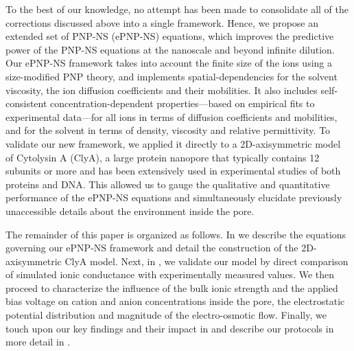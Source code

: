 \documentclass[journal=ancac3,manuscript=article,etalmode=truncate,maxauthors=0,layout=onecolumn]{achemso}
\begin{document}
To the best of our knowledge, no attempt has been made to consolidate all of the corrections discussed above
into a single framework. Hence, we propose an extended set of PNP-NS (ePNP-NS) equations, which improves the
predictive power of the PNP-NS equations at the nanoscale and beyond infinite dilution. Our ePNP-NS framework
takes into account the finite size of the ions using a size-modified PNP theory,\cite{Lu-2011} and implements
spatial-dependencies for the solvent viscosity,\cite{Pronk-2014,Hsu-2017} the ion diffusion coefficients and
their mobilities.\cite{Makarov-1998,Noskov-2004} It also includes self-consistent concentration-dependent
properties---based on empirical fits to experimental data---for all ions in terms of diffusion
coefficients and mobilities,\cite{Baldessari-2008-1,Mills-1989} and for the solvent in terms of density,
viscosity\cite{Hai-Lang-1996} and relative permittivity\cite{Gavish-2016}. To validate our new framework, we
applied it directly to a 2D-axisymmetric model of Cytolysin A (ClyA), a large protein nanopore that typically
contains 12 subunits\cite{Mueller-2009} or more\cite{Soskine-2013} and has been extensively used in
experimental studies of both proteins\cite{Soskine-2013,VanMeervelt-2014,Soskine-Biesemans-2015,
Biesemans-Soskine-2015,Wloka-2017,VanMeervelt-2017,Galenkamp-2018,Willems-Ruic-Biesemans-2019} and
DNA.\cite{Franceschini-2013,Franceschini-2016,Nomidis-2018} This allowed us to gauge the qualitative and
quantitative performance of the ePNP-NS equations and simultaneously elucidate previously unaccessible details
about the environment inside the pore.

The remainder of this paper is organized as follows. In \emph{} we describe the equations
governing our ePNP-NS framework and detail the construction of the 2D-axisymmetric ClyA model. Next, in
\emph{}, we validate our model by direct comparison of simulated ionic conductance with
experimentally measured values. We then proceed to characterize the influence of the bulk ionic strength and
the applied bias voltage on cation and anion concentrations inside the pore, the electrostatic potential
distribution and magnitude of the electro-osmotic flow. Finally, we touch upon our key findings and their
impact in \emph{} and describe our protocols in more detail in
\emph{}.
\end{document}
